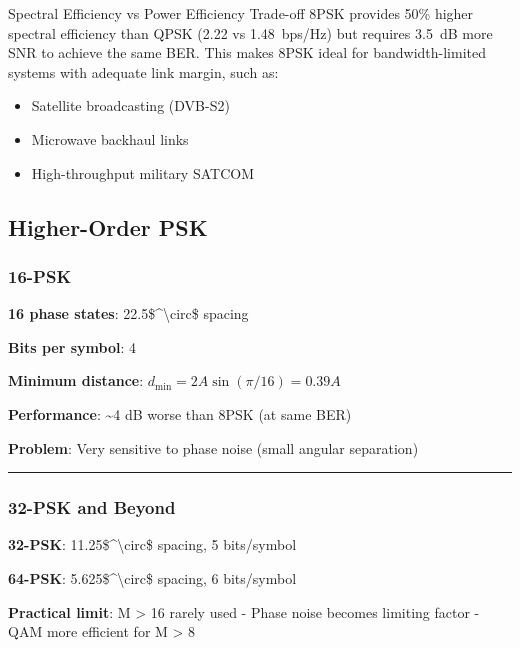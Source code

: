 \begin{calloutbox}{Spectral Efficiency vs Power Efficiency Trade-off}
8PSK provides 50\% higher spectral efficiency than QPSK (2.22 vs 1.48~bps/Hz) but requires 3.5~dB more SNR to achieve the same BER. This makes 8PSK ideal for bandwidth-limited systems with adequate link margin, such as:
\begin{itemize}
\item Satellite broadcasting (DVB-S2)
\item Microwave backhaul links
\item High-throughput military SATCOM
\end{itemize}
\end{calloutbox}

\subsection{Higher-Order PSK}\label{higher-order-psk}

\subsubsection{16-PSK}\label{psk}

\textbf{16 phase states}: 22.5\$\^{}\textbackslash circ\$ spacing

\textbf{Bits per symbol}: 4

\textbf{Minimum distance}: \(d_{\min} = 2A\sin(\pi/16) = 0.39A\)

\textbf{Performance}: \textasciitilde4 dB worse than 8PSK (at same BER)

\textbf{Problem}: Very sensitive to phase noise (small angular
separation)

\begin{center}\rule{0.5\linewidth}{0.5pt}\end{center}

\subsubsection{32-PSK and Beyond}\label{psk-and-beyond}

\textbf{32-PSK}: 11.25\$\^{}\textbackslash circ\$ spacing, 5 bits/symbol

\textbf{64-PSK}: 5.625\$\^{}\textbackslash circ\$ spacing, 6 bits/symbol

\textbf{Practical limit}: M \textgreater{} 16 rarely used - Phase noise
becomes limiting factor - QAM more efficient for M \textgreater{} 8

